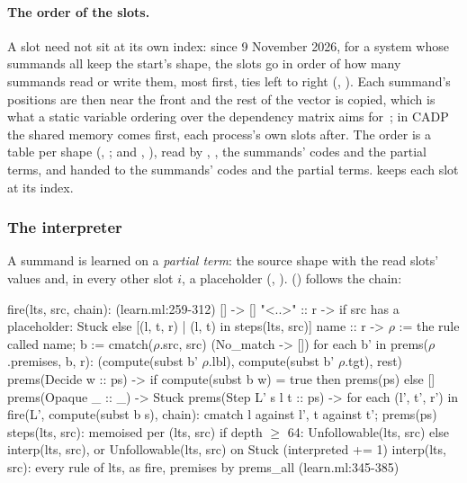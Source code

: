 \paragraph{The order of the slots.} A slot need not sit at its own
index: since 9 November 2026, for a system whose summands all keep the
start's shape, the slots go in order of how many summands read or write
them, most first, ties left to right (,
). Each summand's positions are
then near the front and the rest of the vector is copied, which is what a
static variable ordering over the dependency matrix aims
for~\cite{meijer-vdpol16}; in CADP the shared memory comes first, each
process's own slots after. The order is a table per shape
(, ;  and ,
), read by ,
, the summands' codes and the partial terms, and handed to
the summands' codes and the partial terms.  keeps
each slot at its index.

\subsubsection{The interpreter}\label{sec:sym-interp}

A summand is learned on a \emph{partial term}: the source shape with the
read slots' values and, in every other slot $i$, a placeholder
 (, ).
 () follows
the chain:

\begin{shell}[mathescape=true]
fire(lts, src, chain):                                   (learn.ml:259-312)
  []           -> []
  "<..>" :: r  -> if src has a placeholder: Stuck
                  else [(l, t, r) | (l, t) in steps(lts, src)]
  name :: r    -> $\rho$ := the rule called name;  b := cmatch($\rho$.src, src)   (No_match -> [])
                  for each b' in prems($\rho$.premises, b, r):
                      (compute(subst b' $\rho$.lbl), compute(subst b' $\rho$.tgt), rest)
prems(Decide w :: ps)        -> if compute(subst b w) = true then prems(ps) else []
prems(Opaque _ :: _)         -> Stuck
prems(Step L' s l t :: ps)   -> for each (l', t', r') in fire(L', compute(subst b s), chain):
                                   cmatch l against l', t against t'; prems(ps)
steps(lts, src):  memoised per (lts, src)
  if depth $\ge$ 64: Unfollowable(lts, src)
  else interp(lts, src), or Unfollowable(lts, src) on Stuck   (interpreted += 1)
interp(lts, src): every rule of lts, as fire, premises by prems_all  (learn.ml:345-385)
\end{shell}

